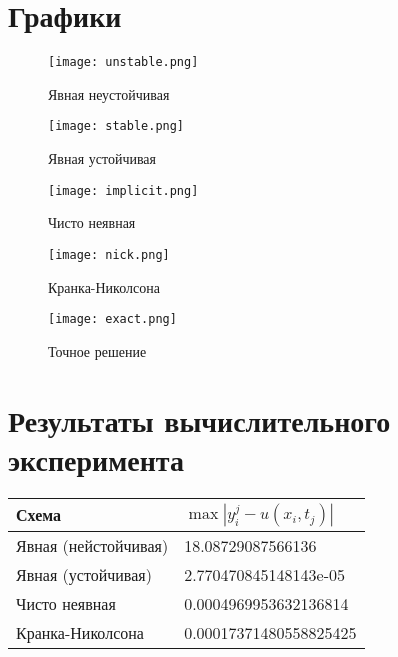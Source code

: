 \documentclass{article}
\begin{document}
\section*{Графики}
\begin{figure}[H]
\texttt{[image: unstable.png]}
\caption{Явная неустойчивая}
\texttt{[image: stable.png]}
\caption{Явная устойчивая}
\end{figure}
\begin{figure}[H]
\texttt{[image: implicit.png]}
\caption{Чисто неявная}
\texttt{[image: nick.png]}
\caption{Кранка-Николсона}
\end{figure}
\begin{figure}[H]
\texttt{[image: exact.png]}
\caption{Точное решение}
\end{figure}

\section*{Результаты вычислительного эксперимента}
\begin{tabular}[H]{|l|l|}
  \hline
  Схема & $\max \left|y_i^j - u(x_i, t_j)\right| $ \\
  \hline
  Явная (нейстойчивая) &  18.08729087566136 \\
  \hline
  Явная (устойчивая) &   2.770470845148143e-05\\
  \hline
  Чисто неявная& 0.0004969953632136814\\
  \hline
  Кранка-Николсона & 0.00017371480558825425 \\
  \hline
\end{tabular} 
\end{document}
